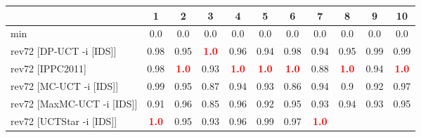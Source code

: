 \documentclass{article}
\begin{document}
\begin{tabular}{|l|r@{$\pm$}rr@{$\pm$}rr@{$\pm$}rr@{$\pm$}rr@{$\pm$}rr@{$\pm$}rr@{$\pm$}rr@{$\pm$}rr@{$\pm$}rr@{$\pm$}r|}
\hline

& \multicolumn{2}{c}{1}
& \multicolumn{2}{c}{2}
& \multicolumn{2}{c}{3}
& \multicolumn{2}{c}{4}
& \multicolumn{2}{c}{5}
& \multicolumn{2}{c}{6}
& \multicolumn{2}{c}{7}
& \multicolumn{2}{c}{8}
& \multicolumn{2}{c}{9}
& \multicolumn{2}{c|}{10}
\\
\hline
\hline
min
& \multicolumn{2}{c}{0.0}
& \multicolumn{2}{c}{0.0}
& \multicolumn{2}{c}{0.0}
& \multicolumn{2}{c}{0.0}
& \multicolumn{2}{c}{0.0}
& \multicolumn{2}{c}{0.0}
& \multicolumn{2}{c}{0.0}
& \multicolumn{2}{c}{0.0}
& \multicolumn{2}{c}{0.0}
& \multicolumn{2}{c|}{0.0}
\\
rev72 [DP-UCT -i [IDS]]
& \multicolumn{2}{c}{0.98}
& \multicolumn{2}{c}{0.95}
& \multicolumn{2}{c}{\textbf{\textcolor{red}{1.0}}}
& \multicolumn{2}{c}{0.96}
& \multicolumn{2}{c}{0.94}
& \multicolumn{2}{c}{0.98}
& \multicolumn{2}{c}{0.94}
& \multicolumn{2}{c}{0.95}
& \multicolumn{2}{c}{0.99}
& \multicolumn{2}{c|}{0.99}
\\
rev72 [IPPC2011]
& \multicolumn{2}{c}{0.98}
& \multicolumn{2}{c}{\textbf{\textcolor{red}{1.0}}}
& \multicolumn{2}{c}{0.93}
& \multicolumn{2}{c}{\textbf{\textcolor{red}{1.0}}}
& \multicolumn{2}{c}{\textbf{\textcolor{red}{1.0}}}
& \multicolumn{2}{c}{\textbf{\textcolor{red}{1.0}}}
& \multicolumn{2}{c}{0.88}
& \multicolumn{2}{c}{\textbf{\textcolor{red}{1.0}}}
& \multicolumn{2}{c}{0.94}
& \multicolumn{2}{c|}{\textbf{\textcolor{red}{1.0}}}
\\
rev72 [MC-UCT -i [IDS]]
& \multicolumn{2}{c}{0.99}
& \multicolumn{2}{c}{0.95}
& \multicolumn{2}{c}{0.87}
& \multicolumn{2}{c}{0.94}
& \multicolumn{2}{c}{0.93}
& \multicolumn{2}{c}{0.86}
& \multicolumn{2}{c}{0.94}
& \multicolumn{2}{c}{0.9}
& \multicolumn{2}{c}{0.92}
& \multicolumn{2}{c|}{0.97}
\\
rev72 [MaxMC-UCT -i [IDS]]
& \multicolumn{2}{c}{0.91}
& \multicolumn{2}{c}{0.96}
& \multicolumn{2}{c}{0.85}
& \multicolumn{2}{c}{0.96}
& \multicolumn{2}{c}{0.92}
& \multicolumn{2}{c}{0.95}
& \multicolumn{2}{c}{0.93}
& \multicolumn{2}{c}{0.94}
& \multicolumn{2}{c}{0.93}
& \multicolumn{2}{c|}{0.95}
\\
rev72 [UCTStar -i [IDS]]
& \multicolumn{2}{c}{\textbf{\textcolor{red}{1.0}}}
& \multicolumn{2}{c}{0.95}
& \multicolumn{2}{c}{0.93}
& \multicolumn{2}{c}{0.96}
& \multicolumn{2}{c}{0.99}
& \multicolumn{2}{c}{0.97}
& \multicolumn{2}{c}{\textbf{\textcolor{red}{1.0}}}

\end{tabular}
\end{document}
